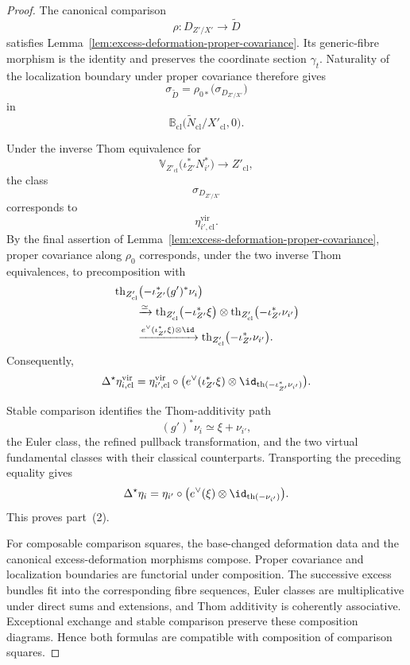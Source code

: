 \begin{proof}
The canonical comparison
\[
    \rho:
    D_{Z'/X'}
    \longrightarrow
    \widetilde D
\]
satisfies
Lemma~\ref{lem:excess-deformation-proper-covariance}.
Its generic-fibre morphism is the identity and preserves the coordinate
section \(\gamma_t\).  Naturality of the localization boundary under proper
covariance therefore gives
\[
    \sigma_{\widetilde D}
    =
    \rho_{0*}
    \bigl(
      \sigma_{D_{Z'/X'}}
    \bigr)
\]
in
\[
    \mathbb B_{\mathrm{cl}}
    \bigl(
      \widetilde N_{\mathrm{cl}}/X'_{\mathrm{cl}},
      0
    \bigr).
\]

Under the inverse Thom equivalence for
\[
    \mathbb V_{Z'_{\mathrm{cl}}}
    \bigl(
      \iota_{Z'}^*N_{i'}^*
    \bigr)
    \longrightarrow
    Z'_{\mathrm{cl}},
\]
the class
\[
    \sigma_{D_{Z'/X'}}
\]
corresponds to
\[
    \eta^{\mathrm{vir}}_{i',\mathrm{cl}}.
\]
By the final assertion of
Lemma~\ref{lem:excess-deformation-proper-covariance},
proper covariance along \(\rho_0\) corresponds, under the two inverse Thom
equivalences, to precomposition with
\[
\begin{aligned}
    &
    \operatorname{th}_{Z'_{\mathrm{cl}}}
    \bigl(
      -\iota_{Z'}^*(g')^*\nu_i
    \bigr)
    \\
    &\qquad\xrightarrow{\simeq}
    \operatorname{th}_{Z'_{\mathrm{cl}}}
    \bigl(
      -\iota_{Z'}^*\xi
    \bigr)
    \otimes
    \operatorname{th}_{Z'_{\mathrm{cl}}}
    \bigl(
      -\iota_{Z'}^*\nu_{i'}
    \bigr)
    \\
    &\qquad\xrightarrow{
      e^\vee(\iota_{Z'}^*\xi)\otimes\id
    }
    \operatorname{th}_{Z'_{\mathrm{cl}}}
    \bigl(
      -\iota_{Z'}^*\nu_{i'}
    \bigr).
\end{aligned}
\]
Consequently,
\[
    \Delta^\star
    \eta^{\mathrm{vir}}_{i,\mathrm{cl}}
    =
    \eta^{\mathrm{vir}}_{i',\mathrm{cl}}
    \circ
    \bigl(
      e^\vee(\iota_{Z'}^*\xi)
      \otimes
      \id_{\operatorname{th}(-\iota_{Z'}^*\nu_{i'})}
    \bigr).
\]

Stable comparison identifies the Thom-additivity path
\[
    (g')^*\nu_i
    \simeq
    \xi+\nu_{i'},
\]
the Euler class, the refined pullback transformation, and the two virtual
fundamental classes with their classical counterparts.  Transporting the
preceding equality gives
\[
    \Delta^\star\eta_i
    =
    \eta_{i'}
    \circ
    \bigl(
      e^\vee(\xi)
      \otimes
      \id_{\operatorname{th}(-\nu_{i'})}
    \bigr).
\]
This proves part~(2).

For composable comparison squares, the base-changed deformation data and
the canonical excess-deformation morphisms compose.  Proper covariance and
localization boundaries are functorial under composition.  The successive
excess bundles fit into the corresponding fibre sequences, Euler classes
are multiplicative under direct sums and extensions, and Thom additivity is
coherently associative.  Exceptional exchange and stable comparison
preserve these composition diagrams.  Hence both formulas are compatible
with composition of comparison squares.
\end{proof}


